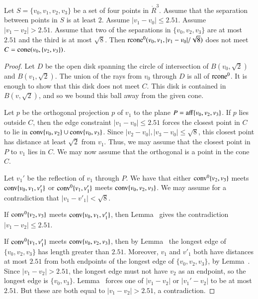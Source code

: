 \begin{lemma}
Let $S=\{v_0,v_1,v_2,v_3\}$ be a set of four points in $\ring{R}^3$.
Assume that the separation between points in $S$ is at least $2$.
Assume $|v_1-v_0|\le 2.51$. Assume $|v_1-v_2|>2.51$.
Assume that two of the separations in $\{v_0,v_2,v_3\}$ are at
          most $2.51$ and the third is at most $\sqrt8$.
     Then ${\operatorname{rcone}}^0(v_0,v_1,|v_1-v_0|/\sqrt8)$ does not meet
$C = {\operatorname{cone}}(v_0,\{v_2,v_3\})$.
\end{lemma}

\begin{proof}
Let $D$ be the open disk spanning the circle of intersection of
$B(v_0,\sqrt2)$ and $B(v_1,\sqrt2)$.  The union of the rays from $v_0$
through $D$ is all of ${\operatorname{rcone}}^0$.  It is enough to show that this
disk does not meet $C$.  This disk is contained in $B(v,\sqrt2)$,
and so we bound this ball away from the given cone.

Let $p$ be the orthogonal 
projection $p$ of $v_1$ to the plane $P={\operatorname{aff}}\{v_0,v_2,v_3\}$.
If $p$  lies outside $C$, then the
edge constraint $|v_1-v_0|\le 2.51$ forces the closest point in $C$ to
lie in ${\operatorname{conv}}\{v_0,v_2\}\cup{\operatorname{conv}}\{v_0,v_3\}$.  Since
$|v_2-v_0|,|v_3-v_0|\le\sqrt8$, this closest point has distance at least
$\sqrt2$ from $v_1$. Thus, we may assume that the closest point in
$P$ to $v_1$ lies in $C$.
We may now assume that the
orthogonal 
is a point in the
cone $C$.

Let $v_1'$ be the reflection of $v_1$ through $P$.  We
have that either ${\operatorname{conv}}^0\{v_2,v_3\}$ meets ${\operatorname{conv}}\{v_0,v_1,v'_1\}$ or
${\operatorname{conv}}^0\{v_1,v'_1\}$ meets ${\operatorname{conv}}\{v_0,v_2,v_3\}$.  We may assume for
a contradiction that $|v_1-v'_1|<\sqrt8$.

If ${\operatorname{conv}}^0\{v_2,v_3\}$ meets ${\operatorname{conv}}\{v_0,v_1,v'_1\}$, then
Lemma~ gives the contradiction
$|v_1-v_2|\le2.51$.

If ${\operatorname{conv}}^0\{v_1,v'_1\}$ meets ${\operatorname{conv}}\{v_0,v_2,v_3\}$, then by
Lemma~ the longest edge of $\{v_0,v_2,v_3\}$
has length greater than $2.51$. 
Moreover, $v_1$ and $v'_1$ both have distances at most $2.51$
from both endpoints of the longest edge of $\{v_0,v_2,v_3\}$, 
by Lemma~.  Since
$|v_1-v_2|>2.51$, the longest edge must not have $v_2$ as an endpoint,
so the longest edge is $\{v_0,v_3\}$.
Lemma~ forces one of $|v_1-v_2|$ or
$|v_1'-v_2|$ to be at most $2.51$. But these are both equal to
$|v_1-v_2|>2.51$, a contradiction.
\end{proof}


